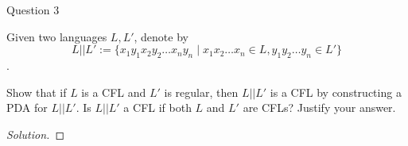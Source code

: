 \begin{solution}{Question 3}\label{ques:3}
    \begin{question}
    Given two languages $L, L'$, denote by 
$$L||L' := \{x_1y_1x_2y_2 \dots x_ny_n \mid x_1x_2 \dots x_n \in L, y_1y_2\dots y_n \in L'\}$$. 

Show that if $L$ is a CFL and $L'$ is regular, then $L || L'$ is a CFL by constructing a PDA for $L || L'$. Is $L || L'$ a CFL if both $L$ and $L'$ are CFLs? Justify your answer.
    \end{question}
    \tcblower{}
    \begin{proof}[Solution]
    \end{proof}
\end{solution}
